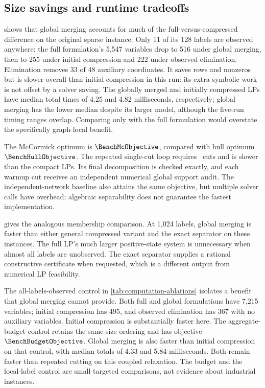 \subsection{Size savings and runtime tradeoffs}





 shows that global merging accounts for much
of the full-versus-compressed difference on the original sparse instance.
Only 11 of its 128 labels are observed anywhere: the full formulation's
5,547 variables drop to 516 under global merging, then to 255 under initial
compression and 222 under observed elimination. Elimination removes 33 of
48 auxiliary coordinates. It saves rows and nonzeros but is slower overall
than initial compression in this run: its extra symbolic work is not offset
by a solver saving. The globally merged and initially compressed
LPs have median total times of 4.25 and 4.82 milliseconds, respectively;
global merging has the lower median despite its larger model, although the
five-run timing ranges overlap.
Comparing only with the full formulation would overstate the specifically
graph-local benefit.

The McCormick optimum is $\BenchMcObjective$, compared with hull optimum
$\BenchHullObjective$. The repeated single-cut loop requires
\BenchCutCount\ cuts and is slower than the compact LPs. Its final
decomposition is checked exactly, and each warmup cut receives an independent
numerical global support audit. The independent-network baseline also attains
the same objective, but multiple solver calls have overhead; algebraic
separability does not guarantee the fastest implementation.

 gives the analogous membership comparison.
At 1,024 labels, global merging is faster than either general compressed
variant and the exact separator on these instances. The full LP's much
larger positive-state system is unnecessary when almost all labels are
unobserved. The exact separator supplies a rational constructive certificate
when requested, which is a different output from numerical LP feasibility.

The all-labels-observed control in \cref{tab:computation-ablations}
isolates a benefit that global merging cannot provide. Both full and global
formulations have 7,215 variables; initial compression has 495, and observed
elimination has 367 with no auxiliary variables. Initial compression is
substantially faster here. The aggregate-budget control retains the same
size ordering and has objective $\BenchBudgetObjective$. Global merging is
also faster than initial compression on that control, with median totals of
4.33 and 5.84 milliseconds. Both remain faster than repeated cutting on this
coupled relaxation.
The budget and the local-label control are small targeted comparisons, not
evidence about industrial instances.

